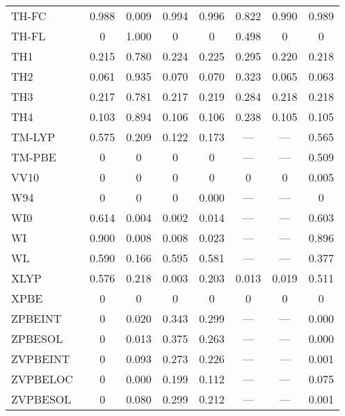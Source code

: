 \begin{table*}
\begin{tabular}{|l|c|c|c|c|c|c|c|}
TH-FC~\cite{Tozer1997_183} & 0.988 & 0.009 & 0.994 & 0.996 & 0.822 & 0.990 & 0.989 \\
TH-FL~\cite{Tozer1997_183} & 0 & 1.000 & 0 & 0 & 0.498 & 0 & 0 \\
TH1~\cite{Tozer1998_2545} & 0.215 & 0.780 & 0.224 & 0.225 & 0.295 & 0.220 & 0.218 \\
TH2~\cite{Tozer1998_3162} & 0.061 & 0.935 & 0.070 & 0.070 & 0.323 & 0.065 & 0.063 \\
TH3~\cite{Handy1998_707} & 0.217 & 0.781 & 0.217 & 0.219 & 0.284 & 0.218 & 0.218 \\
TH4~\cite{Handy1998_707} & 0.103 & 0.894 & 0.106 & 0.106 & 0.238 & 0.105 & 0.105 \\
TM-LYP~\cite{Thakkar2009_134109} & 0.575 & 0.209 & 0.122 & 0.173 & --- & --- & 0.565 \\
TM-PBE~\cite{Thakkar2009_134109} & 0 & 0 & 0 & 0 & --- & --- & 0.509 \\
VV10~\cite{Vydrov2010_244103} & 0 & 0 & 0 & 0 & 0 & 0 & 0.005 \\
W94~\cite{Wilson1994_337} & 0 & 0 & 0 & 0.000 & --- & --- & 0 \\
WI0~\cite{Wilson1998_523} & 0.614 & 0.004 & 0.002 & 0.014 & --- & --- & 0.603 \\
WI~\cite{Wilson1998_523} & 0.900 & 0.008 & 0.008 & 0.023 & --- & --- & 0.896 \\
WL~\cite{Wilson1990_12930} & 0.590 & 0.166 & 0.595 & 0.581 & --- & --- & 0.377 \\
XLYP~\cite{Xu2004_2673} & 0.576 & 0.218 & 0.003 & 0.203 & 0.013 & 0.019 & 0.511 \\
XPBE~\cite{Xu2004_4068} & 0 & 0 & 0 & 0 & 0 & 0 & 0 \\
ZPBEINT~\cite{Constantin2011_233103} & 0 & 0.020 & 0.343 & 0.299 & --- & --- & 0.000 \\
ZPBESOL~\cite{Constantin2011_233103} & 0 & 0.013 & 0.375 & 0.263 & --- & --- & 0.000 \\
ZVPBEINT~\cite{Constantin2012_194105} & 0 & 0.093 & 0.273 & 0.226 & --- & --- & 0.001 \\
ZVPBELOC~\cite{Fabiano2015_122} & 0 & 0.000 & 0.199 & 0.112 & --- & --- & 0.075 \\
ZVPBESOL~\cite{Constantin2012_194105} & 0 & 0.080 & 0.299 & 0.212 & --- & --- & 0.001 \\
\bottomrule
\end{tabular}
\end{table*}
